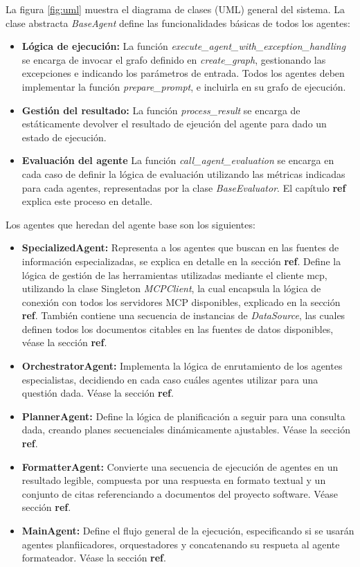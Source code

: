 La figura \ref{fig:uml} muestra el diagrama de clases (UML) general del sistema. La clase abstracta \textit{BaseAgent} define las funcionalidades básicas de todos los agentes: 
\begin{itemize}
  \item\textbf{Lógica de ejecución: }La función \textit{execute\_agent\_with\_exception\_handling} se encarga de invocar el grafo definido en \textit{create\_graph}, gestionando las excepciones e indicando los parámetros de entrada. Todos los agentes deben implementar la función \textit{prepare\_prompt}, e incluirla en su grafo de ejecución.
  \item\textbf{Gestión del resultado: }La función \textit{process\_result} se encarga de estáticamente devolver el resultado de ejeución del agente para dado un estado de ejecución. 
  \item\textbf{Evaluación del agente }La función \textit{call\_agent\_evaluation} se encarga en cada caso de definir la lógica de evaluación utilizando las métricas indicadas para cada agentes, representadas por la clase \textit{BaseEvaluator}. El capítulo \textbf{ref} explica este proceso en detalle.
\end{itemize}

Los agentes que heredan del agente base son los siguientes:


\begin{itemize}
  \item\textbf{SpecializedAgent: }Representa a los agentes que buscan en las fuentes de información especializadas, se explica en detalle en la sección \textbf{ref}. Define la lógica de gestión de las herramientas utilizadas mediante el cliente mcp, utilizando la clase Singleton \textit{MCPClient}, la cual encapsula la lógica de conexión con todos los servidores MCP disponibles, explicado en la sección \textbf{ref}. También contiene una secuencia de instancias de \textit{DataSource}, las cuales definen todos los documentos citables en las fuentes de datos disponibles, véase la sección \textbf{ref}.
  \item\textbf{OrchestratorAgent: }Implementa la lógica de enrutamiento de los agentes especialistas, decidiendo en cada caso cuáles agentes utilizar para una questión dada. Véase la sección \textbf{ref}. 
  \item\textbf{PlannerAgent: }Define la lógica de planificación a seguir para una consulta dada, creando planes secuenciales dinámicamente ajustables. Véase la sección \textbf{ref}.
  \item\textbf{FormatterAgent: }Convierte una secuencia de ejecución de agentes en un resultado legible, compuesta por una respuesta en formato textual y un conjunto de citas referenciando a documentos del proyecto software. Véase sección \textbf{ref}.
  \item\textbf{MainAgent: }Define el flujo general de la ejecución, especificando si se usarán agentes planfiicadores, orquestadores y concatenando su respueta al agente formateador. Véase la sección \textbf{ref}. 
\end{itemize}

